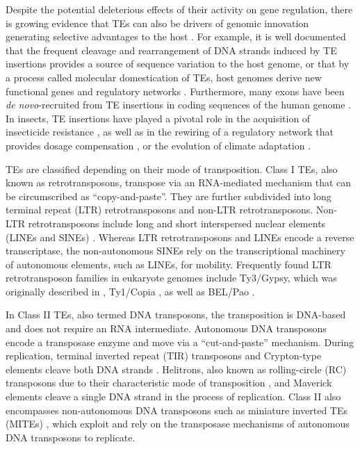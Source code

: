 Despite the potential deleterious effects of their activity on gene
regulation, there is growing evidence that TEs can also be drivers of
genomic innovation generating selective advantages to the host
\citep{Casola2007,Gonzalez2010}. For example, it is well documented that
the frequent cleavage and rearrangement of DNA strands induced by TE
insertions provides a source of sequence variation to the host genome,
or that by a process called molecular domestication of TEs, host genomes
derive new functional genes and regulatory networks
\citep{Feschotte2008,Boehne2008,Santos2014}.  Furthermore, many exons
have been \emph{de novo}-recruited from TE insertions in coding
sequences of the human genome \citep{Zhang2006}.  In insects, TE
insertions have played a pivotal role in the acquisition of insecticide
resistance \citep{Chen2007,Itokawa2010,Gahan2001}, as well as in the
rewiring of a regulatory network that provides dosage compensation
\citep{Ellison2013}, or the evolution of climate adaptation
\citep{Gonzalez2010,Kim2014}.



TEs are classified depending on their mode of transposition. Class I
TEs, also known as retrotransposons, transpose via an RNA-mediated
mechanism that can be circumscribed as ``copy-and-paste''. They are
further subdivided into long terminal repeat (LTR) retrotransposons and
non-LTR retrotransposons. Non-LTR retrotransposons include long and
short interspersed nuclear elements (LINEs and SINEs)
\citep{Malik1999,Eickbush2008}. Whereas LTR retrotransposons and LINEs
encode a reverse transcriptase, the non-autonomous SINEs rely on the
transcriptional machinery of autonomous elements, such as LINEs, for
mobility. Frequently found LTR retrotransposon families in eukaryote
genomes include Ty3/Gypsy, which was originally described in
 \citep{Marin2000}, Ty1/Copia
\citep{Flavell1992}, as well as BEL/Pao \citep{de_la_Chaux2011}.

In Class II TEs, also termed DNA transposons, the transposition is
DNA-based and does not require an RNA intermediate. Autonomous DNA
transposons encode a transposase enzyme and move via a ``cut-and-paste''
mechanism. During replication, terminal inverted repeat (TIR)
transposons and Crypton-type elements cleave both DNA strands
\citep{Wicker2007}. Helitrons, also known as rolling-circle (RC)
transposons due to their characteristic mode of transposition
\citep{Kapitonov2001}, and Maverick elements \citep{Kapitonov2006}
cleave a single DNA strand in the process of replication. Class II also
encompasses non-autonomous DNA transposons such as miniature inverted
TEs (MITEs) \citep{Shirasawa2012}, which exploit and rely on the
transposase mechanisms of autonomous DNA transposons to replicate.


